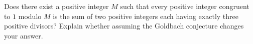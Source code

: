 Does there exist a positive integer $M$ such that every positive integer congruent to $1$ modulo $M$ is the sum of two positive integers each having exactly three positive divisors? Explain whether assuming the Goldbach conjecture changes your answer.
